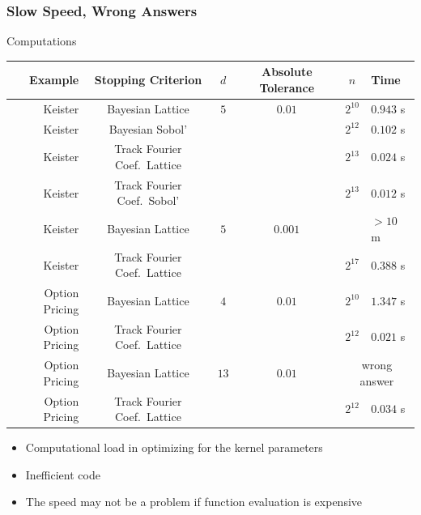 \documentclass[11pt,compress,xcolor={usenames,dvipsnames},aspectratio=169]{beamer}
\begin{document}
\begin{frame}\frametitle{Slow Speed, Wrong Answers}
{\small 
\vspace{-3ex}

Computations \href{https://colab.research.google.com/drive/1KrlrtLu7j8Ff7YsSJjPMiGUr-UKfqwxm?usp=sharing}{}

\vspace{-3ex}
\begin{center}
{\footnotesize
\begin{tabular}{rccccl}
	Example & Stopping Criterion & $d$ & Absolute Tolerance & $n$ & Time \\ \toprule
	Keister & Bayesian Lattice \cite{RatHic19a} & $5$ & $0.01$ & $2^{10}$ & $0.943$ s \\
	Keister & Bayesian Sobol' \cite{JagHic22a} &&&  $2^{12}$ & $0.102$ s \\
	Keister & Track Fourier Coef.\ Lattice \cite{JimHic16a} &&& $2^{13}$ & $0.024$ s \\
	Keister & Track Fourier Coef.\  Sobol' \cite{HicJim16a} &&& $2^{13}$ & $0.012$ s \\ \midrule
	Keister & Bayesian Lattice \cite{RatHic19a} & $5$ & $0.001$ &  & \alert{$> 10$ m} \\
	Keister & Track Fourier Coef.\ Lattice \cite{JimHic16a} &&& $2^{17}$ & $0.388$ s \\ \toprule
Option Pricing  & Bayesian Lattice \cite{RatHic19a} & $4$ & $0.01$ & $2^{10}$ & $1.347$ s \\
Option Pricing  & Track Fourier Coef.\ Lattice \cite{JimHic16a} &&& $2^{12}$ & $0.021$ s \\ \midrule
Option Pricing  & Bayesian Lattice \cite{RatHic19a} & $13$ & $0.01$ & \multicolumn{2}{c}{\alert{wrong answer}}\\
Option Pricing  & Track Fourier Coef.\ Lattice \cite{JimHic16a} &&& $2^{12}$ & $0.034$ s \\ \bottomrule
\end{tabular}
}
\end{center}
\vspace{-3ex}
\begin{itemize}
	\setlength{\itemsep}{-0.5ex}
	\item Computational load in \alert{optimizing} for the kernel parameters
	\item \alert{Inefficient} code
	\item The speed may not be a problem if function evaluation is \alert{expensive}
\end{itemize}
}
\end{frame}
\end{document}
